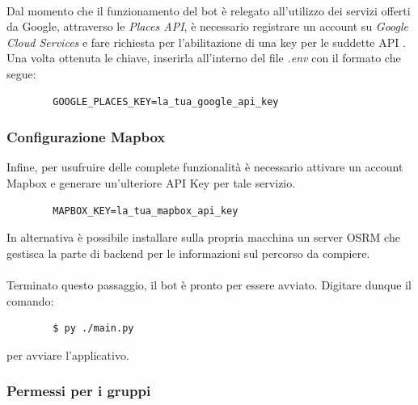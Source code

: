 \documentclass[a4paper, 12pt]{article}
\begin{document}
	\paragraph{}
	Dal momento che il funzionamento del bot è relegato all'utilizzo dei servizi offerti da Google, attraverso le \textit{Places API}, è necessario registrare un account su \textit{Google Cloud Services} e fare richiesta per l'abilitazione di una key per le suddette API \cite{places_api_key_registration}.
	Una volta ottenuta le chiave, inserirla all'interno del file \textit{.env} con il formato che segue:
	\begin{verbatim}
		GOOGLE_PLACES_KEY=la_tua_google_api_key
	\end{verbatim}
	
	\subsubsection{Configurazione Mapbox}
	Infine, per usufruire delle complete funzionalità è necessario attivare un account Mapbox\cite{mapbox_api} e generare un'ulteriore API Key per tale servizio.\\
	\begin{verbatim}
		MAPBOX_KEY=la_tua_mapbox_api_key
	\end{verbatim}
	In alternativa è possibile installare sulla propria macchina un server OSRM \cite{osrm} che gestisca la parte di backend per le informazioni sul percorso da compiere.
	\paragraph{}
	Terminato questo passaggio, il bot è pronto per essere avviato. Digitare dunque il comando:
	\begin{verbatim}
		$ py ./main.py
	\end{verbatim}
	per avviare l'applicativo.
	
	\newpage
	\subsubsection{Permessi per i gruppi}
\end{document}
